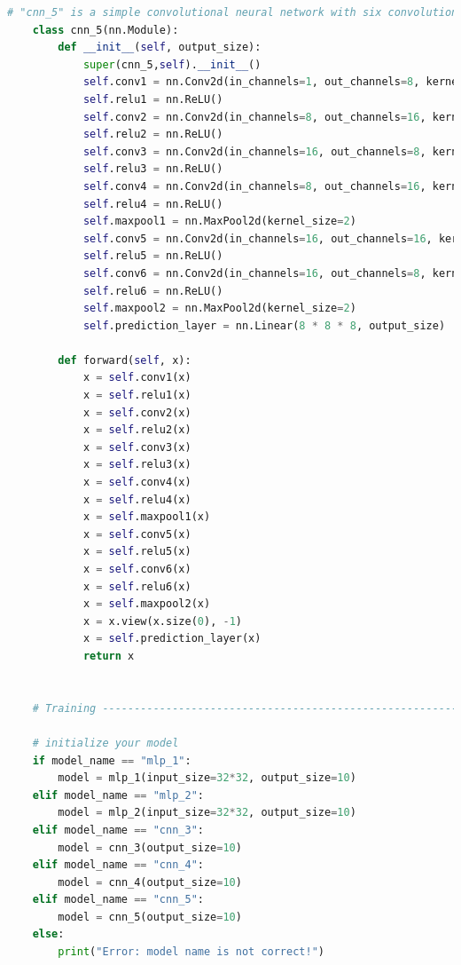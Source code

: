 \documentclass[3p,times,procedia]{elsarticle}
\begin{document}
\begin{lstlisting}[language=Python]
    # "cnn_5" is a simple convolutional neural network with six convolutional layers
    class cnn_5(nn.Module):
        def __init__(self, output_size):
            super(cnn_5,self).__init__()
            self.conv1 = nn.Conv2d(in_channels=1, out_channels=8, kernel_size=3, padding=1)   # 1x32x32 -> 8x32x32
            self.relu1 = nn.ReLU()
            self.conv2 = nn.Conv2d(in_channels=8, out_channels=16, kernel_size=3, padding=1)  # 8x32x32 -> 16x32x32
            self.relu2 = nn.ReLU()
            self.conv3 = nn.Conv2d(in_channels=16, out_channels=8, kernel_size=3, padding=1)  # 16x32x32 -> 8x32x32
            self.relu3 = nn.ReLU()
            self.conv4 = nn.Conv2d(in_channels=8, out_channels=16, kernel_size=3, padding=1)  # 8x32x32 -> 16x32x32
            self.relu4 = nn.ReLU()
            self.maxpool1 = nn.MaxPool2d(kernel_size=2)                                       # 16x32x32 -> 16x16x16
            self.conv5 = nn.Conv2d(in_channels=16, out_channels=16, kernel_size=3, padding=1) # 16x16x16 -> 16x16x16
            self.relu5 = nn.ReLU()
            self.conv6 = nn.Conv2d(in_channels=16, out_channels=8, kernel_size=3, padding=1)  # 16x16x16 -> 8x16x16 
            self.relu6 = nn.ReLU()
            self.maxpool2 = nn.MaxPool2d(kernel_size=2)                                       # 8x16x16 -> 8x8x8
            self.prediction_layer = nn.Linear(8 * 8 * 8, output_size)                         # 8x8x8 -> 10
    
        def forward(self, x):
            x = self.conv1(x)
            x = self.relu1(x)
            x = self.conv2(x)
            x = self.relu2(x)
            x = self.conv3(x)
            x = self.relu3(x)
            x = self.conv4(x)
            x = self.relu4(x)
            x = self.maxpool1(x)
            x = self.conv5(x)
            x = self.relu5(x)
            x = self.conv6(x)
            x = self.relu6(x)
            x = self.maxpool2(x)
            x = x.view(x.size(0), -1)
            x = self.prediction_layer(x)
            return x
    
    
    # Training -------------------------------------------------------------------------------#
    
    # initialize your model
    if model_name == "mlp_1":
        model = mlp_1(input_size=32*32, output_size=10)
    elif model_name == "mlp_2":
        model = mlp_2(input_size=32*32, output_size=10)
    elif model_name == "cnn_3":
        model = cnn_3(output_size=10)
    elif model_name == "cnn_4":
        model = cnn_4(output_size=10)
    elif model_name == "cnn_5":
        model = cnn_5(output_size=10)
    else:
        print("Error: model name is not correct!")
    

\end{lstlisting}
\end{document}
